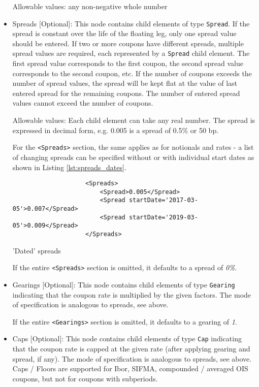 \begin{itemize}
Allowable values: any non-negative whole number

\item Spreads [Optional]: This node contains child elements of type
  \lstinline!Spread!. If the spread is constant over the life of the
  floating leg, only one spread value should be entered. If two or more
  coupons have different spreads, multiple spread values are required,
  each represented by a \lstinline!Spread! child element. The first
  spread value corresponds to the first coupon, the second spread
  value corresponds to the second coupon, etc. If the number of
  coupons exceeds the number of spread values, the spread will be kept
  flat at the value of last entered spread for the remaining coupons.
  The number of entered spread values cannot exceed the number of
  coupons. 

  Allowable values: Each child element can take any real number. The spread is expressed in decimal form, e.g. 0.005 is
  a spread of 0.5\% or 50 bp. 

For the {\tt <Spreads>} section, the same applies as for notionals and
rates - a list of changing spreads can be specified without or with individual start dates as shown
in Listing \ref{lst:spreads_dates}.
\begin{listing}[H]
\begin{verbatim}
                    <Spreads>
                        <Spread>0.005</Spread>
                        <Spread startDate='2017-03-05'>0.007</Spread>
                        <Spread startDate='2019-03-05'>0.009</Spread>
                    </Spreads>
\end{verbatim}
\caption{'Dated' spreads}
\label{lst:spreads_dates}
\end{listing}

If the entire {\tt <Spreads>} section is omitted, it defaults to a spread of \emph{0\%}.

\item Gearings [Optional]: This node contains child elements of type \lstinline!Gearing! indicating that the coupon rate is
  multiplied by the given factors. The mode of specification is analogous to spreads, see above.
  
If the entire {\tt <Gearings>} section is omitted, it defaults to a gearing of \emph{1}.

\item Caps [Optional]: This node contains child elements of type \lstinline!Cap! indicating that the coupon rate is
  capped at the given rate (after applying gearing and spread, if any). The mode of specification is analogous to
  spreads, see above. Caps / Floors are supported for Ibor, SIFMA, compounded / averaged OIS coupons, but not for coupons
  with subperiods.


\end{itemize}
